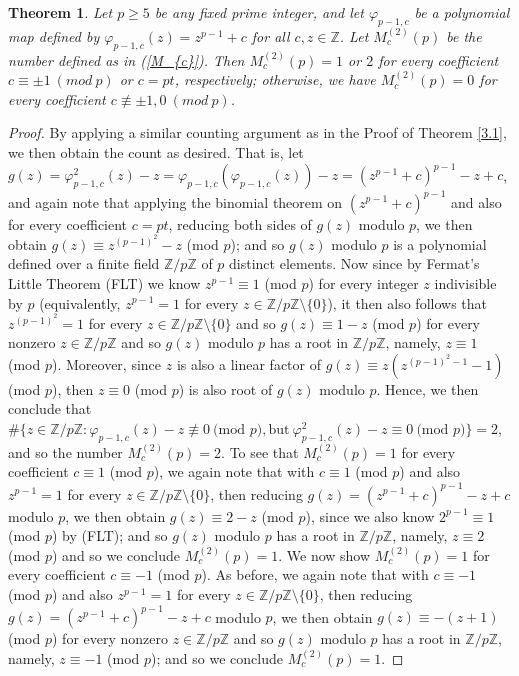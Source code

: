 \documentclass{article}
\theoremstyle{plain}
\newtheorem{thm}{Theorem}[section]
\theoremstyle{definition}
\begin{document}
\begin{thm} \label{3.2}
Let $p\geq 5$ be any fixed prime integer, and let $\varphi_{p-1, c}$ be a polynomial map defined by $\varphi_{p-1, c}(z) = z^{p-1}+c$ for all $c, z\in\mathbb{Z}$. Let $M_{c}^{(2)}(p)$ be the number defined as in \textnormal{(\ref{M_{c}})}. Then $M_{c}^{(2)}(p) = 1$ or $2$ for every coefficient $c\equiv \pm 1 \ (mod \ p)$ or $c = pt$, respectively; otherwise, we have $M_{c}^{(2)}(p) = 0$ for every coefficient  $c\not \equiv \pm 1, 0\ (mod \ p)$.
\end{thm}
\begin{proof}
By applying a similar counting argument as in the Proof of Theorem \ref{3.1}, we then obtain the count as desired. That is, let $g(z)= \varphi_{p-1,c}^2(z)-z = \varphi_{p-1,c}(\varphi_{p-1,c}(z)) - z = (z^{p-1}+c)^{p-1} - z + c$, and again note that applying the binomial theorem on $(z^{p-1} + c)^{p-1}$ and also for every coefficient $c=pt$, reducing both sides of $g(z)$ modulo $p$, we then obtain $g(z)\equiv z^{(p-1)^2} - z$ (mod $p$); and so $g(z)$ modulo $p$ is a polynomial defined over a finite field $\mathbb{Z}\slash p\mathbb{Z}$ of $p$ distinct elements. Now since by Fermat's Little Theorem (FLT) we know $z^{p-1}\equiv 1$ (mod $p$) for every integer $z$ indivisible by $p$ (equivalently, $z^{p-1} = 1$ for every $z\in \mathbb{Z}\slash p\mathbb{Z}\setminus \{0\}$), it then also follows that $z^{(p-1)^2}=1$ for every $z\in \mathbb{Z}\slash p\mathbb{Z}\setminus \{0\}$ and so $g(z)\equiv 1 - z$ (mod $p$) for every nonzero $z\in \mathbb{Z}\slash p\mathbb{Z}$ and so $g(z)$ modulo $p$ has a root in $\mathbb{Z}\slash p\mathbb{Z}$, namely, $z\equiv 1$ (mod $p$). Moreover, since $z$ is also a linear factor of $g(z)\equiv z(z^{(p-1)^2-1} - 1)$ (mod $p$), then $z\equiv 0$ (mod $p$) is also root of $g(z)$ modulo $p$. Hence, we then conclude that $\#\{ z\in \mathbb{Z} / p\mathbb{Z} : \varphi_{p-1,c}(z) -z \not \equiv 0 \ \text{(mod $p$)}, \text{but} \ \varphi_{p-1,c}^2(z) - z \equiv 0 \ \text{(mod $p$)}\} = 2$, and so the number $M_{c}^{(2)}(p) = 2$. To see that $M_{c}^{(2)}(p) = 1$ for every coefficient $c\equiv 1$ (mod $p$), we again note that with $c\equiv 1$ (mod $p$) and also $z^{p-1} = 1$ for every $z\in \mathbb{Z}\slash p\mathbb{Z}\setminus \{0\}$, then reducing $g(z)= (z^{p-1}+c)^{p-1} - z + c$ modulo $p$, we then obtain $g(z)\equiv 2 - z$ (mod $p$), since we also know $2^{p-1}\equiv 1$ (mod $p$) by (FLT); and so $g(z)$ modulo $p$ has a root in $\mathbb{Z}\slash p\mathbb{Z}$, namely, $z\equiv 2$ (mod $p$) and so we conclude $M_{c}^{(2)}(p) = 1$. We now show $M_{c}^{(2)}(p) = 1$ for every coefficient $c\equiv -1$ (mod $p$). As before, we again note that with $c \equiv -1$ (mod $p$) and also $z^{p-1} = 1$ for every $z\in \mathbb{Z}\slash p\mathbb{Z}\setminus \{0\}$, then reducing $g(z)= (z^{p-1}+c)^{p-1} - z + c$ modulo $p$, we then obtain $g(z) \equiv -(z+1)$ (mod $p$) for every nonzero $z\in \mathbb{Z}\slash p\mathbb{Z}$ and so $g(z)$ modulo $p$ has a root in $\mathbb{Z}\slash p\mathbb{Z}$, namely, $z\equiv -1$ (mod $p$); and so we conclude $M_{c}^{(2)}(p) = 1$. 


\end{proof}
\end{document}

